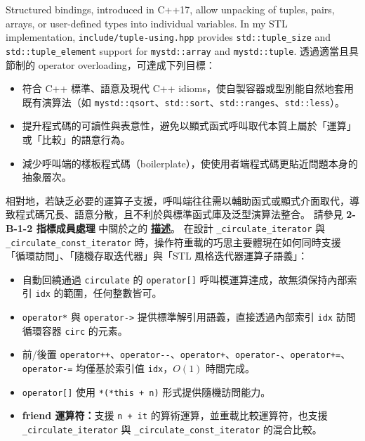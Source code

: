\documentclass[a4paper,12pt]{article}
\begin{document}
\label{bindings}
Structured bindings, introduced in C++17, allow unpacking of tuples, pairs, arrays, or user-defined types into individual variables. In my STL implementation, \verb|include/tuple-using.hpp| provides \verb|std::tuple_size| and \verb|std::tuple_element| support for \verb|mystd::array| and \verb|mystd::tuple|.
透過適當且具節制的 operator overloading，可達成下列目標：
\begin{itemize}
\item 符合 C++ 標準、語意及現代 C++ idioms，使自製容器或型別能自然地套用既有演算法（如 \verb|mystd::qsort|、\verb|std::sort|、\verb|std::ranges|、\verb|std::less|）。
\item 提升程式碼的可讀性與表意性，避免以顯式函式呼叫取代本質上屬於「運算」或「比較」的語意行為。
\item 減少呼叫端的樣板程式碼（boilerplate），使使用者端程式碼更貼近問題本身的抽象層次。
\end{itemize}

相對地，若缺乏必要的運算子支援，呼叫端往往需以輔助函式或顯式介面取代，導致程式碼冗長、語意分散，且不利於與標準函式庫及泛型演算法整合。
請參見 \textbf{2-B-1-2 指標成員處理} 中關於之的 \hyperref[vector-describe]{\textbf{描述}}。
在設計 \verb|_circulate_iterator| 與 \verb|_circulate_const_iterator| 時，操作符重載的巧思主要體現在如何同時支援「循環訪問」、「隨機存取迭代器」與「STL 風格迭代器運算子語義」：
\begin{itemize}
\item 自動回繞通過 \verb|circulate| 的 \verb|operator[]| 呼叫模運算達成，故無須保持內部索引 \verb|idx| 的範圍，任何整數皆可。
\item \verb|operator*| 與 \verb|operator->| 提供標準解引用語義，直接透過內部索引 \verb|idx| 訪問循環容器 \verb|circ| 的元素。
\item 前/後置 \verb|operator++|、\verb|operator--|、\verb|operator+|、\verb|operator-|、\verb|operator+=|、\verb|operator-=| 均僅基於索引值 \verb|idx|，$O(1)$ 時間完成。
\item \verb|operator[]| 使用 \verb|*(*this + n)| 形式提供隨機訪問能力。
\item \textbf{friend 運算符：}支援 \verb|n + it| 的算術運算，並重載比較運算符，也支援 \verb|_circulate_iterator| 與 \verb|_circulate_const_iterator| 的混合比較。
\end{itemize}
\end{document}
